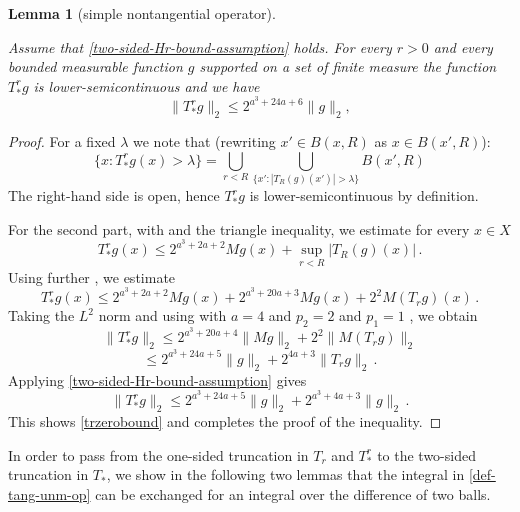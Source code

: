 \documentclass[10pt,a4paper]{article}
\theoremstyle{plain}
\newtheorem{lemma}[theorem]{Lemma}
\theoremstyle{definition}
\numberwithin{equation}{subsection}
\newcommand{\lean}[1]{}
\newcommand{\uses}[1]{}
\newcommand{\leanok}{}
\begin{document}
\begin{lemma}[simple nontangential operator]\label{simple-nontangential-operator}
\leanok
\lean{simple_nontangential_operator, lowerSemicontinuous_simpleNontangentialOperator}
\uses{Hardy-Littlewood,Cotlar-estimate}
Assume that \eqref{two-sided-Hr-bound-assumption} holds.
For every $r>0$ and every bounded measurable function $g$ supported on a set of finite measure
the function $T_{*}^r g$ is lower-semicontinuous and we have
\begin{equation}\label{trzerobound}
    \|T_{*}^rg\|_2\le 2^{a^3+24a+6}\|g\|_2,
\end{equation}
\end{lemma}
\begin{proof}
\leanok
For a fixed $\lambda$ we note that (rewriting $x'\in B(x,R)$ as $x\in B(x',R)$):
\begin{equation}
    \{x : T_{*}^r g(x) > \lambda\} = \bigcup_{r<R}\bigcup_{\{x':|T_R(g)(x')|>\lambda\}} B(x',R)
\end{equation}
The right-hand side is open, hence $T_{*}^r g$ is lower-semicontinuous by definition.

For the second part, with  and the triangle inequality, we estimate for every $x\in X$
\begin{equation}
     T_{*}^r g(x)
     \le 2^{a^3 + 2a + 2} Mg(x)+\sup_{r<R} |T_R(g)(x)|\, .
\end{equation}
Using further , we estimate
\begin{equation}
      T_{*}^r g(x)
     \le 2^{a^3+2a+2}Mg(x) + 2^{a^3+20a+3}Mg(x) + 2^{2}M(T_rg)(x)\, .
\end{equation}
Taking the $L^2$ norm and using  with $a=4$  and $p_2=2$ and $p_1=1$ , we obtain
\begin{equation}
      \|T_{*}^r g\|_2
     \le 2^{a^3+20a+4} \|Mg\|_2 + 2^{2}\|M(T_rg)\|_2
\end{equation}
\begin{equation}
     \le 2^{a^3+24a+5} \|g\|_2 + 2^{4a+3}\|T_r g\|_2\, .
\end{equation}
Applying \eqref{two-sided-Hr-bound-assumption} gives
\begin{equation}
      \|T_{*}^r g\|_2\le 2^{a^3+24a+5}\|g\|_2 + 2^{a^3+4a+3}\|g\|_2\, .
\end{equation}
This shows \eqref{trzerobound} and completes the proof of the inequality.
\end{proof}
In order to pass from the one-sided truncation in $T_r$ and $T_{*}^r$ to the two-sided truncation in $T_*$, we show in the following two lemmas that the integral in \eqref{def-tang-unm-op} can be exchanged for an integral over the difference of two balls.
\end{document}
